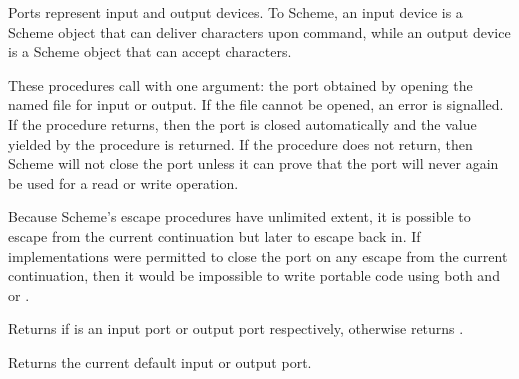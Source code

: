Ports represent input and output devices.  To Scheme, an input device is a
Scheme object that can deliver characters upon command, while an output device
is a Scheme object that can accept characters.


\begin{entry}{%
}

 These procedures call  with one argument: the
port obtained by opening the named file for input or output.  If the
file cannot be opened, an error is signalled.  If the procedure returns,
then the port is closed automatically and the value yielded by the
procedure is returned.  If the procedure does not return, then Scheme
will not close the port unless it can prove that the port will never
again be used for a read or write operation.

\begin{rationale}
Because Scheme's escape procedures have unlimited extent, it  is
possible to escape from the current continuation but later to escape back in. 
If implementations were permitted to close the port on any escape from the
current continuation, then it would be impossible to write portable code using
both  and  or
.
\end{rationale} 
\end{entry}


\begin{entry}{%
}

Returns \schtrue{} if  is an input port or output port
respectively, otherwise returns \schfalse.


\end{entry}


\begin{entry}{%
}
 
Returns the current default input or output port.

\end{entry}


